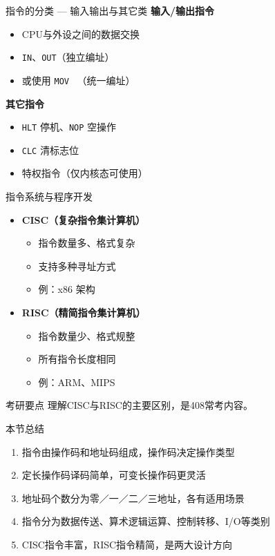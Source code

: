 \documentclass[10pt, aspectratio=169]{beamer}
\begin{document}
\begin{frame}{指令的分类 --- 输入输出与其它类}
    \textbf{输入/输出指令}
    \begin{itemize}
        \item CPU与外设之间的数据交换
        \item \texttt{IN}、\texttt{OUT}（独立编址）
        \item 或使用 \texttt{MOV} \ （统一编址）
    \end{itemize}
    \vspace{0.3em}
    \textbf{其它指令}
    \begin{itemize}
        \item \texttt{HLT} 停机、\texttt{NOP} 空操作
        \item \texttt{CLC} 清标志位
        \item 特权指令（仅内核态可使用）
    \end{itemize}
\end{frame}

\begin{frame}{指令系统与程序开发}
    \begin{itemize}
        \item \textbf{CISC（复杂指令集计算机）}
            \begin{itemize}
                \item 指令数量多、格式复杂
                \item 支持多种寻址方式
                \item 例：x86 架构
            \end{itemize}
        \item \textbf{RISC（精简指令集计算机）}
            \begin{itemize}
                \item 指令数量少、格式规整
                \item 所有指令长度相同
                \item 例：ARM、MIPS
            \end{itemize}
    \end{itemize}
    \vspace{0.5em}
    \begin{block}{考研要点}
        理解CISC与RISC的主要区别，是408常考内容。
    \end{block}
\end{frame}

\begin{frame}{本节总结}
    \begin{enumerate}
        \item 指令由操作码和地址码组成，操作码决定操作类型
        \item 定长操作码译码简单，可变长操作码更灵活
        \item 地址码个数分为零／一／二／三地址，各有适用场景
        \item 指令分为数据传送、算术逻辑运算、控制转移、I/O等类别
        \item CISC指令丰富，RISC指令精简，是两大设计方向
    \end{enumerate}
\end{frame}
\end{document}
